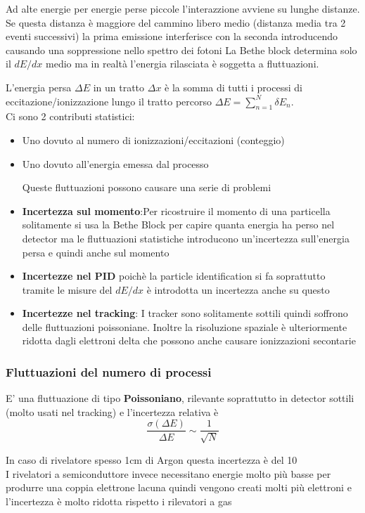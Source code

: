   Ad alte energie per energie perse piccole l'interazzione avviene su lunghe distanze. Se questa distanza è maggiore del cammino libero medio (distanza media tra 2 eventi successivi) la prima emissione interferisce con la seconda introducendo causando una soppressione nello spettro dei fotoni
La Bethe block determina solo il $dE/dx$ medio ma in realtà l'energia rilasciata è soggetta a fluttuazioni.

L'energia persa $\Delta E$ in un tratto $\Delta x$ è la somma di tutti i processi di eccitazione/ionizzazione lungo il tratto percorso $\Delta E= \sum^N_{n=1} \delta E_n$.\\
Ci sono 2 contributi statistici:
\begin{itemize}
    \item Uno dovuto al numero di ionizzazioni/eccitazioni (conteggio)
    \item Uno dovuto all'energia emessa dal processo

    Queste fluttuazioni possono causare una serie di problemi

    \item \textbf{Incertezza sul momento}:Per ricostruire il momento di una particella solitamente si usa la Bethe Block per capire quanta energia ha perso nel detector ma le fluttuazioni statistiche introducono un'incertezza sull'energia persa e quindi anche sul momento
    \item \textbf{Incertezze nel PID} poichè la particle identification si fa soprattutto tramite le misure del $dE/dx$ è introdotta un incertezza anche su questo
    \item \textbf{Incertezze nel tracking}: I tracker sono solitamente sottili quindi soffrono delle fluttuazioni poissoniane. Inoltre la risoluzione spaziale è ulteriormente ridotta dagli elettroni delta che possono anche causare ionizzazioni secontarie

\end{itemize}

\subsubsection*{Fluttuazioni del numero di processi}
E' una fluttuazione di tipo \textbf{Poissoniano}, rilevante soprattutto in detector sottili (molto usati nel tracking) e l'incertezza relativa è
\[\frac{\sigma(\Delta E)}{\Delta E}\sim\frac{1}{\sqrt{N}}\]

\begin{remark}

    In caso di rivelatore spesso 1cm di Argon questa incertezza è del 10%
\\
    I rivelatori a semiconduttore invece necessitano energie molto più basse per produrre una coppia elettrone lacuna quindi vengono creati molti più elettroni e l'incertezza è molto ridotta rispetto i rilevatori a gas

\end{remark}

